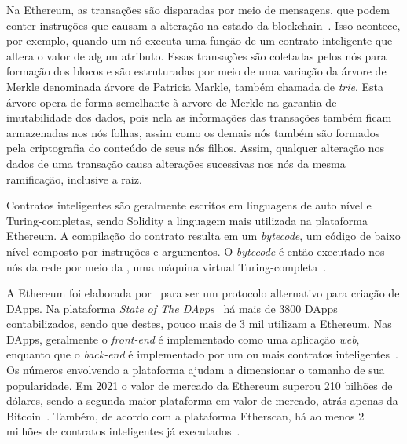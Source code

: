 Na Ethereum, as transações são disparadas por meio de mensagens, que podem conter instruções que causam a alteração na estado da blockchain~\cite{wood2014ethereum-yellow-paper}. Isso acontece, por exemplo, quando um nó executa uma função de um contrato inteligente que altera o valor de algum atributo. Essas transações são coletadas pelos nós para formação dos blocos e são estruturadas por meio de uma variação da árvore de Merkle denominada árvore de Patricia Markle, também chamada de \textit{trie}. Esta árvore opera de forma semelhante à arvore de Merkle na garantia de imutabilidade dos dados, pois nela as informações das transações também ficam armazenadas nos nós folhas, assim como os demais nós também são formados pela criptografia do conteúdo de seus nós filhos. Assim, qualquer alteração nos dados de uma transação causa alterações sucessivas nos nós da mesma ramificação, inclusive a raiz.

Contratos inteligentes são geralmente escritos em linguagens de auto nível e Turing-completas, sendo Solidity a linguagem mais utilizada na plataforma Ethereum. A compilação do contrato resulta em um \textit{bytecode}, um código de baixo nível composto por instruções e argumentos. O \textit{bytecode} é então executado nos nós da rede por meio da , uma máquina virtual Turing-completa~\cite{overview-chen2020blockchain-graph, overview-syed2019comparative}.

A Ethereum foi elaborada por~ para ser um protocolo alternativo para criação de DApps. Na plataforma \textit{State of The DApps}~\cite{state-dapps-2021} há mais de 3800 DApps contabilizados, sendo que destes, pouco mais de 3 mil utilizam a Ethereum. Nas DApps, geralmente o \textit{front-end} é implementado como uma aplicação \textit{web}, enquanto que o \textit{back-end} é implementado por um ou mais contratos inteligentes~\cite{survey-Hewa2021smart-contract}. Os números envolvendo a plataforma ajudam a dimensionar o tamanho de sua popularidade. Em 2021 o valor de mercado da Ethereum superou 210 bilhões de dólares, sendo a segunda maior plataforma em valor de mercado, atrás apenas da Bitcoin~\cite{coinmarketcap2021}. Também, de acordo com a plataforma Etherscan, há ao menos 2 milhões de contratos inteligentes já executados~\cite{etherscan2020contracts}.

